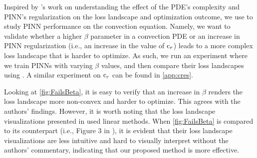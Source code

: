 \documentclass[letterpaper]{article} %
\begin{document}
           Inspired by \cite{krishnapriyan2021characterizing}'s work on understanding the effect of the PDE's complexity and PINN's regularization 
          on the loss landscape and optimization outcome, we use \proposedautencoder{} to study PINN performance on the convection equation. Namely, we want to validate whether a higher $\beta$ parameter in a convection PDE or an increase in PINN regularization (i.e., an increase in the value of $\text{c}_{r}$) leads to a more complex loss landscape that is harder to optimize. As such, we run an experiment where we train PINNs with varying $\beta$ values, and then compare their loss landscapes using \proposedautencoder{}. A similar experiment on $\text{c}_{r}$ can be found in \cref{app:cres}. 

          Looking at \cref{fig:FailsBeta}, it is easy to verify that an increase in $\beta$ renders the loss landscape more non-convex and harder to optimize. This agrees with the authors' findings. However, it is worth noting that the loss landscape visualizations presented in \cite{krishnapriyan2021characterizing}  used linear methods. When \cref{fig:FailsBeta} is compared to its counterpart (i.e.,  Figure 3 in \cite{krishnapriyan2021characterizing}), it is evident that their loss landscape visualizations are
          less intuitive and hard to visually interpret without the authors' commentary, indicating that our proposed method is more effective.
             
\end{document}

